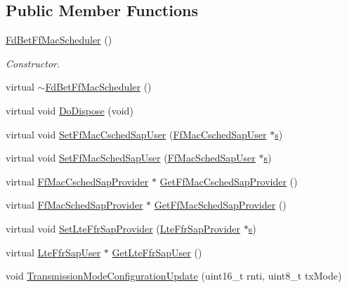 \subsection*{Public Member Functions}
\begin{DoxyCompactItemize}
\item 
\hyperlink{classns3_1_1FdBetFfMacScheduler_a1b822a1e109a5065a13476957a48a033}{Fd\+Bet\+Ff\+Mac\+Scheduler} ()
\begin{DoxyCompactList}\small\item\em Constructor. \end{DoxyCompactList}\item 
virtual \hyperlink{classns3_1_1FdBetFfMacScheduler_a76b16d62ee9bea7e093fc912113564f2}{$\sim$\+Fd\+Bet\+Ff\+Mac\+Scheduler} ()
\item 
virtual void \hyperlink{classns3_1_1FdBetFfMacScheduler_a70b8d16f14cebf0d09eb7d310c8bb43a}{Do\+Dispose} (void)
\item 
virtual void \hyperlink{classns3_1_1FdBetFfMacScheduler_a59485f453bece31800d8e08b9405e0dd}{Set\+Ff\+Mac\+Csched\+Sap\+User} (\hyperlink{classns3_1_1FfMacCschedSapUser}{Ff\+Mac\+Csched\+Sap\+User} $\ast$\hyperlink{generate__test__data__lte__sinr_8m_ad83eeb3a142285d1243a08c6b7026df8}{s})
\item 
virtual void \hyperlink{classns3_1_1FdBetFfMacScheduler_a2565a48db906bf2de6a3a68754a8874b}{Set\+Ff\+Mac\+Sched\+Sap\+User} (\hyperlink{classns3_1_1FfMacSchedSapUser}{Ff\+Mac\+Sched\+Sap\+User} $\ast$\hyperlink{generate__test__data__lte__sinr_8m_ad83eeb3a142285d1243a08c6b7026df8}{s})
\item 
virtual \hyperlink{classns3_1_1FfMacCschedSapProvider}{Ff\+Mac\+Csched\+Sap\+Provider} $\ast$ \hyperlink{classns3_1_1FdBetFfMacScheduler_a3d0d87c59aabfb0ae196f1b185665e1d}{Get\+Ff\+Mac\+Csched\+Sap\+Provider} ()
\item 
virtual \hyperlink{classns3_1_1FfMacSchedSapProvider}{Ff\+Mac\+Sched\+Sap\+Provider} $\ast$ \hyperlink{classns3_1_1FdBetFfMacScheduler_af83c039e1b492d9043ba3c387059a378}{Get\+Ff\+Mac\+Sched\+Sap\+Provider} ()
\item 
virtual void \hyperlink{classns3_1_1FdBetFfMacScheduler_a547efd279a829fc1d6e9982e6c554698}{Set\+Lte\+Ffr\+Sap\+Provider} (\hyperlink{classns3_1_1LteFfrSapProvider}{Lte\+Ffr\+Sap\+Provider} $\ast$\hyperlink{generate__test__data__lte__sinr_8m_ad83eeb3a142285d1243a08c6b7026df8}{s})
\item 
virtual \hyperlink{classns3_1_1LteFfrSapUser}{Lte\+Ffr\+Sap\+User} $\ast$ \hyperlink{classns3_1_1FdBetFfMacScheduler_acacef08a2b50d563c4a0efc1285b0e91}{Get\+Lte\+Ffr\+Sap\+User} ()
\item 
void \hyperlink{classns3_1_1FdBetFfMacScheduler_a8bd5d04242320959e7cb33d3ac655154}{Transmission\+Mode\+Configuration\+Update} (uint16\+\_\+t rnti, uint8\+\_\+t tx\+Mode)
\end{DoxyCompactItemize}
